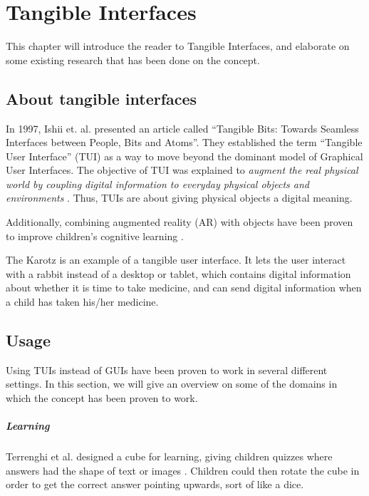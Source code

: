 \chapter{Tangible Interfaces}
\label{chp:tangibleinterfaces}

This chapter will introduce the reader to Tangible Interfaces, and elaborate on some existing research that has been done on the concept.   

\section{About tangible interfaces}

In 1997, Ishii et. al. presented an article called ``Tangible Bits: Towards Seamless Interfaces between People, Bits and Atoms''. They established the term ``Tangible User Interface'' (TUI) as a way to move beyond the dominant model of Graphical User Interfaces. The objective of TUI was explained to \emph{augment the real physical world by coupling digital information to everyday physical objects and environments} \cite{ishii1997tangible}. Thus, TUIs are about giving physical objects a digital meaning. 

Additionally, combining augmented reality (AR) with objects have been proven to improve children's cognitive learning \cite{zhou2004magic}.   


The Karotz is an example of a tangible user interface. It lets the user interact with a rabbit instead of a desktop or tablet, which contains digital information about whether it is time to take medicine, and can send digital information when a child has taken his/her medicine.      


\section{Usage}
Using TUIs instead of GUIs have been proven to work in several different settings. In this section, we will give an overview on some of the domains in which the concept has been proven to work. 

\paragraph{Learning}
Terrenghi et al. designed a cube for learning, giving children quizzes where answers had the shape of text or images \cite{terrenghi2006cube}. Children could then rotate the cube in order to get the correct answer pointing upwards, sort of like a dice.

